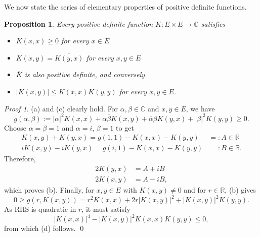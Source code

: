 \documentclass[a4paper,12pt]{article}
\newtheorem{prp}[thm]{Proposition}
\theoremstyle{remark}
\newtheorem*{prf}{Proof}
\theoremstyle{definition}
\theoremstyle{definition}
\theoremstyle{definition}
\newcommand{\abs}[1]{\left| #1 \right|}
\begin{document}
We now state the series of elementary properties of positive definite functions.
\begin{prp}
	Every positive definite function \( K:E \times E \to \mathbb{C} \) satisfies
	\begin{itemize}
		\item[(a)] \( K(x,x) \ge 0 \) for every \( x \in E \)
		\item[(b)] \( K(x,y)=\overline{K(y,x)} \) for every \( x,y \in E \)
		\item[(c)] \( \overline{K} \) is also positive definite, and conversely
		\item[(d)] \( \abs{K(x,y)} \le K(x,x)K(y,y) \) for every \( x,y \in E \).
	\end{itemize}
\end{prp}
\begin{prf}
	(a) and (c) clearly hold. For \( \alpha, \beta \in \mathbb{C} \) and \( x,y \in E \), we have
	\begin{equation*}
		g(\alpha,\beta) := \abs{\alpha}^2 K(x,x) + \alpha \overline{\beta}K(x,y) + \overline{\alpha}\beta K(y,x) + \abs{\beta}^2 K(y,y) \ge 0.
	\end{equation*}
	Choose \( \alpha=\beta=1 \) and \( \alpha = i \), \( \beta=1 \) to get
	\begin{equation*}
		\begin{aligned}
			K(x,y) + K(y,x) = g(1,1) - K(x,x) - K(y,y)     & =: A \in \mathbb{R}  \\
			i K(x,y) - i K(y,x) = g(i,1) - K(x,x) - K(y,y) & =: B \in \mathbb{R}.
		\end{aligned}
	\end{equation*}
	Therefore,
	\begin{equation*}
		\begin{aligned}
			2 K(y,x) & = A + iB  \\
			2 K(x,y) & = A - iB,
		\end{aligned}
	\end{equation*}
	which proves (b). Finally, for \( x,y \in E \) with \( K(x,y) \neq 0 \) and for \( r \in \mathbb{R} \), (b) gives
	\begin{equation*}
		0 \ge g(r,K(x,y)) = r ^2 K(x,x) + 2r \abs{K(x,y)}^2 + \abs{K(x,y)}^2K(y,y).
	\end{equation*}
	As RHS is quadratic in \( r \), it must satisfy
	\begin{equation*}
		\abs{K(x,x)}^4 - \abs{K(x,y)}^2K(x,x)K(y,y) \le 0,
	\end{equation*}
	from which (d) follows.
	\qed\end{prf}
\end{document}
